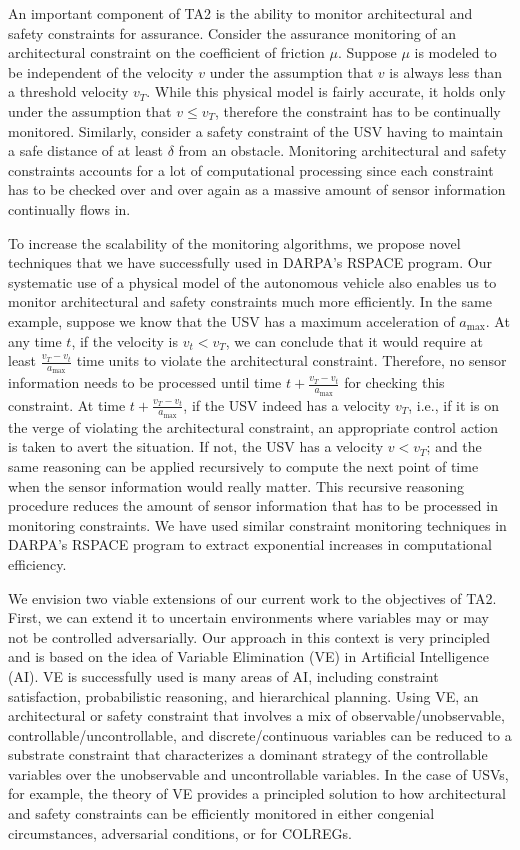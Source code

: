 An important component of TA2 is the ability to monitor architectural and safety constraints for assurance. Consider the assurance monitoring of an architectural constraint on the coefficient of friction $\mu$. Suppose $\mu$ is modeled to be independent of the velocity $v$ under the assumption that $v$ is always less than a threshold velocity $v_{T}$. While this physical model is fairly accurate, it holds only under the assumption that $v \le v_T$, therefore the constraint has to be continually monitored. Similarly, consider a safety constraint of the USV having to maintain a safe distance of at least $\delta$ from an obstacle. Monitoring architectural and safety constraints accounts for a lot of computational processing since each  constraint has to be checked over and over again as a massive amount of sensor information continually flows in.

To increase the scalability of the monitoring algorithms, we propose novel techniques that we have successfully used in DARPA's RSPACE program. Our systematic use of a physical model of the autonomous vehicle also enables us to monitor architectural and safety constraints much more efficiently. In the same example, suppose we know that the USV has a maximum acceleration of $a_{\max}$. At any time $t$, if the velocity is $v_t < v_T$, we can conclude that it would require at least $\frac{v_T - v_t}{a_{\max}}$ time units to violate the architectural constraint. Therefore, no sensor information needs to be processed until time $t + \frac{v_T - v_t}{a_{\max}}$ for checking this constraint. At time $t + \frac{v_T - v_t}{a_{\max}}$, if the USV indeed has a velocity $v_T$, i.e., if it is on the verge of violating the architectural constraint, an appropriate control action is taken to avert the situation. If not, the USV has a velocity $v < v_T$; and the same reasoning can be applied recursively to compute the next point of time when the sensor information would really matter. This recursive reasoning procedure reduces the amount of sensor information that has to be processed in monitoring  constraints. We have used similar constraint monitoring techniques in DARPA's RSPACE program to extract exponential increases in computational efficiency.

We envision two viable extensions of our current work to the objectives of TA2. First, we can extend it to uncertain environments where variables may or may not be controlled adversarially. Our approach in this context is very principled and is based on the idea of Variable Elimination (VE) in Artificial Intelligence (AI). VE is successfully used is many areas of AI, including constraint satisfaction, probabilistic reasoning, and hierarchical planning. Using VE, an architectural or safety constraint that involves a mix of observable/unobservable, controllable/uncontrollable, and discrete/continuous variables can be reduced to a substrate constraint that characterizes a dominant strategy of the controllable variables over the unobservable and uncontrollable variables. In the case of USVs, for example, the theory of VE provides a principled solution to how architectural and safety constraints can be efficiently monitored in either congenial circumstances, adversarial conditions, or for COLREGs.


